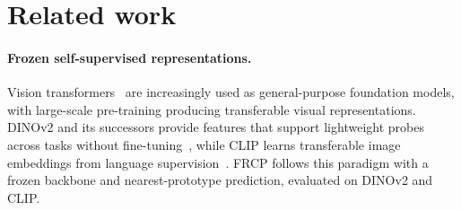 
\section{Related work}
\label{sec:related}

\paragraph{Frozen self-supervised representations.}
Vision transformers~\citep{dosovitskiy2021image} are increasingly used as general-purpose foundation models, with large-scale pre-training producing transferable visual representations. DINOv2 and its successors provide features that support lightweight probes across tasks without fine-tuning~\citep{oquab2023dinov2, simeoni2025dinov3}, while CLIP learns transferable image embeddings from language supervision~\citep{radford2021clip}. FRCP follows this paradigm with a frozen backbone and nearest-prototype prediction, evaluated on DINOv2 and CLIP.

